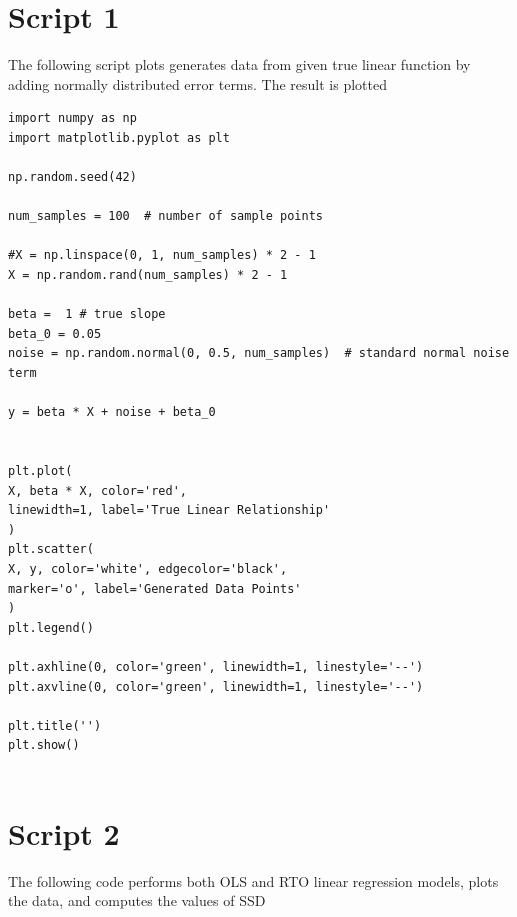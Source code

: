 \documentclass[12pt,a4paper,oneside]{book} %
\begin{document}
	\section{Script 1}
	
The following script plots generates data from given true linear function by adding normally distributed error terms. The result is plotted 
	
\begin{mdframed}[linecolor=black, topline=true, bottomline=true,
	leftline=false, rightline=false, backgroundcolor=yellow!20!white]
\begin{verbatim}
import numpy as np
import matplotlib.pyplot as plt

np.random.seed(42)

num_samples = 100  # number of sample points

#X = np.linspace(0, 1, num_samples) * 2 - 1
X = np.random.rand(num_samples) * 2 - 1

beta =  1 # true slope
beta_0 = 0.05
noise = np.random.normal(0, 0.5, num_samples)  # standard normal noise term

y = beta * X + noise + beta_0


plt.plot(
X, beta * X, color='red', 
linewidth=1, label='True Linear Relationship'
)
plt.scatter(
X, y, color='white', edgecolor='black', 
marker='o', label='Generated Data Points'
)
plt.legend()

plt.axhline(0, color='green', linewidth=1, linestyle='--')
plt.axvline(0, color='green', linewidth=1, linestyle='--')

plt.title('')
plt.show()
	
\end{verbatim}
\end{mdframed}


\section{Script 2}

The following code performs both OLS and RTO linear regression models, plots the data, and computes the values of SSD
\end{document}
